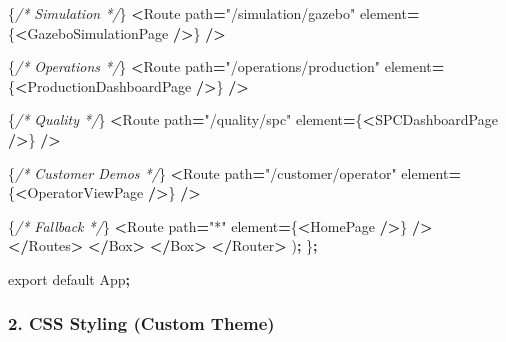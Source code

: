 \documentclass[
]{article}
\newenvironment{Shaded}{\begin{snugshade}}{\end{snugshade}}
\newcommand{\CommentTok}[1]{\textcolor[rgb]{0.56,0.35,0.01}{\textit{#1}}}
\newcommand{\ImportTok}[1]{#1}
\newcommand{\NormalTok}[1]{#1}
\newcommand{\OperatorTok}[1]{\textcolor[rgb]{0.81,0.36,0.00}{\textbf{#1}}}
\newcommand{\StringTok}[1]{\textcolor[rgb]{0.31,0.60,0.02}{#1}}
\begin{document}
\begin{Shaded}
\begin{Highlighting}[]
\NormalTok{            \{}\CommentTok{/* Simulation */}\NormalTok{\}}
            \OperatorTok{\textless{}}\NormalTok{Route path}\OperatorTok{=}\StringTok{"/simulation/gazebo"}\NormalTok{ element}\OperatorTok{=}\NormalTok{\{}\OperatorTok{\textless{}}\NormalTok{GazeboSimulationPage }\OperatorTok{/\textgreater{}}\NormalTok{\} }\OperatorTok{/\textgreater{}}

\NormalTok{            \{}\CommentTok{/* Operations */}\NormalTok{\}}
            \OperatorTok{\textless{}}\NormalTok{Route path}\OperatorTok{=}\StringTok{"/operations/production"}\NormalTok{ element}\OperatorTok{=}\NormalTok{\{}\OperatorTok{\textless{}}\NormalTok{ProductionDashboardPage }\OperatorTok{/\textgreater{}}\NormalTok{\} }\OperatorTok{/\textgreater{}}

\NormalTok{            \{}\CommentTok{/* Quality */}\NormalTok{\}}
            \OperatorTok{\textless{}}\NormalTok{Route path}\OperatorTok{=}\StringTok{"/quality/spc"}\NormalTok{ element}\OperatorTok{=}\NormalTok{\{}\OperatorTok{\textless{}}\NormalTok{SPCDashboardPage }\OperatorTok{/\textgreater{}}\NormalTok{\} }\OperatorTok{/\textgreater{}}

\NormalTok{            \{}\CommentTok{/* Customer Demos */}\NormalTok{\}}
            \OperatorTok{\textless{}}\NormalTok{Route path}\OperatorTok{=}\StringTok{"/customer/operator"}\NormalTok{ element}\OperatorTok{=}\NormalTok{\{}\OperatorTok{\textless{}}\NormalTok{OperatorViewPage }\OperatorTok{/\textgreater{}}\NormalTok{\} }\OperatorTok{/\textgreater{}}

\NormalTok{            \{}\CommentTok{/* Fallback */}\NormalTok{\}}
            \OperatorTok{\textless{}}\NormalTok{Route path}\OperatorTok{=}\StringTok{"*"}\NormalTok{ element}\OperatorTok{=}\NormalTok{\{}\OperatorTok{\textless{}}\NormalTok{HomePage }\OperatorTok{/\textgreater{}}\NormalTok{\} }\OperatorTok{/\textgreater{}}
          \OperatorTok{\textless{}/}\NormalTok{Routes}\OperatorTok{\textgreater{}}
        \OperatorTok{\textless{}/}\NormalTok{Box}\OperatorTok{\textgreater{}}
      \OperatorTok{\textless{}/}\NormalTok{Box}\OperatorTok{\textgreater{}}
    \OperatorTok{\textless{}/}\NormalTok{Router}\OperatorTok{\textgreater{}}
\NormalTok{  )}\OperatorTok{;}
\NormalTok{\}}\OperatorTok{;}

\ImportTok{export} \ImportTok{default}\NormalTok{ App}\OperatorTok{;}
\end{Highlighting}
\end{Shaded}

\hypertarget{css-styling-custom-theme}{%
\subsubsection{2. CSS Styling (Custom
Theme)}\label{css-styling-custom-theme}}
\end{document}
